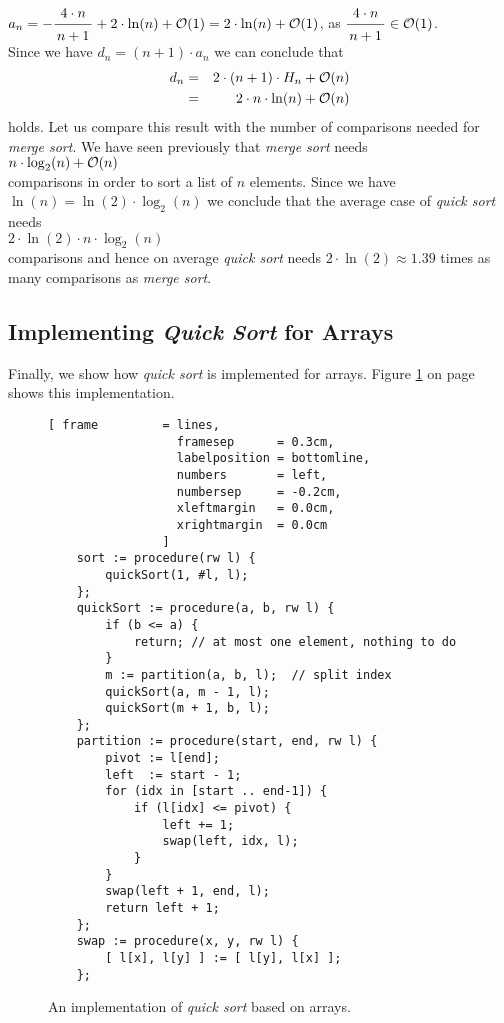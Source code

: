 \\[0.2cm]
\hspace*{1.3cm}
$a_n = - \bruch{4 \cdot n}{n+1}  + 2 \cdot \ln(n) + \Oh(1) =  2 \cdot \ln(n) + \Oh(1)$,
\quad as \quad $\bruch{4 \cdot n}{n+1} \in \Oh(1)$.
\\[0.2cm]
Since we have $d_n = (n+1) \cdot a_{n}$ we can conclude that
\begin{eqnarray*}  
 d_n & = &  2 \cdot(n+1) \cdot H_n + \mathcal{O}(n) \\
     & = & 2 \cdot n \cdot \ln(n) + \mathcal{O}(n)
\end{eqnarray*}
holds.  Let us compare this result with the number of comparisons needed for \emph{merge sort}.
We have seen previously that \emph{merge sort} needs
\\[0.2cm]
\hspace*{1.3cm} $n \cdot \log_2(n) + \mathcal{O}(n)$ \\[0.2cm]
comparisons in order to sort a list of $n$ elements.  Since we have $\ln(n) = \ln(2) \cdot
\log_2(n)$
we conclude that the average case of \emph{quick sort} needs
 \\[0.2cm]
\hspace*{1.3cm} $2 \cdot \ln(2) \cdot n \cdot \log_2(n)$ \\[0.2cm]
comparisons and hence on average \emph{quick sort} needs  $2 \cdot \ln(2) \approx 1.39$ times as many comparisons as
\emph{merge sort}.  


\subsection{Implementing \emph{Quick Sort} for Arrays}
Finally, we show how \emph{quick sort}  is implemented for arrays.  Figure
\ref{fig:quick-sort-array.stlx} on page \pageref{fig:quick-sort-array.stlx} shows this implementation. 

\begin{figure}[!ht]
  \centering
\begin{Verbatim}[ frame         = lines, 
                  framesep      = 0.3cm, 
                  labelposition = bottomline,
                  numbers       = left,
                  numbersep     = -0.2cm,
                  xleftmargin   = 0.0cm,
                  xrightmargin  = 0.0cm
                ]
    sort := procedure(rw l) {
        quickSort(1, #l, l);
    };
    quickSort := procedure(a, b, rw l) {
        if (b <= a) {
            return; // at most one element, nothing to do
        }
        m := partition(a, b, l);  // split index
        quickSort(a, m - 1, l);
        quickSort(m + 1, b, l);
    };
    partition := procedure(start, end, rw l) {
        pivot := l[end];
        left  := start - 1;
        for (idx in [start .. end-1]) {
            if (l[idx] <= pivot) {
                left += 1;
                swap(left, idx, l);
            }
        }
        swap(left + 1, end, l);
        return left + 1;
    };    
    swap := procedure(x, y, rw l) {
        [ l[x], l[y] ] := [ l[y], l[x] ];
    };
\end{Verbatim}
\vspace*{-0.3cm}
  \caption{An implementation of \emph{quick sort} based on arrays.}
  \label{fig:quick-sort-array.stlx}
\end{figure}

